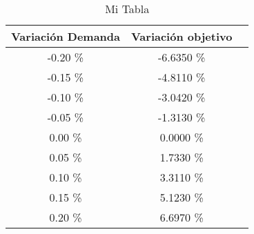 \begin{table}
\centering
\begin{tabular}{|c|c|c|}
\hline
 Variación Demanda & Variación objetivo \\ \hline
-0.20 \% & -6.6350 \% \\ \hline
-0.15 \% & -4.8110 \% \\ \hline
-0.10 \% & -3.0420 \% \\ \hline
-0.05 \% & -1.3130 \% \\ \hline
0.00 \% & 0.0000 \% \\ \hline
0.05 \% & 1.7330 \% \\ \hline
0.10 \% & 3.3110 \% \\ \hline
0.15 \% & 5.1230 \% \\ \hline
0.20 \% & 6.6970 \% \\ \hline
\end{tabular}
\caption{Mi Tabla}
\end{table}
